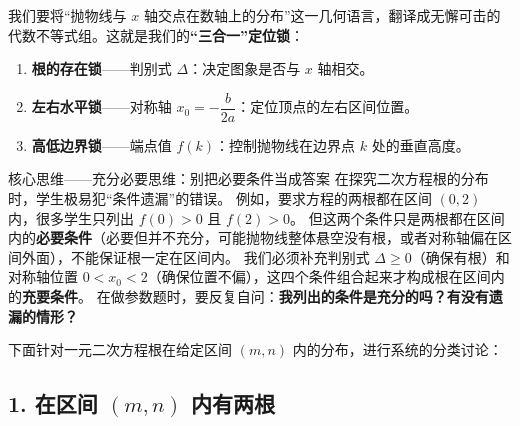 \documentclass[11pt,a4paper]{ctexart}
\begin{document}
我们要将“抛物线与 $x$ 轴交点在数轴上的分布”这一几何语言，翻译成无懈可击的代数不等式组。这就是我们的\textbf{“三合一”定位锁}：
\begin{enumerate}
  \item \textbf{根的存在锁}——判别式 $\Delta$：决定图象是否与 $x$ 轴相交。
  \item \textbf{左右水平锁}——对称轴 $x_0 = -\dfrac{b}{2a}$：定位顶点的左右区间位置。
  \item \textbf{高低边界锁}——端点值 $f(k)$：控制抛物线在边界点 $k$ 处的垂直高度。
\end{enumerate}

\begin{keybox}{核心思维——充分必要思维：别把必要条件当成答案}
在探究二次方程根的分布时，学生极易犯“条件遗漏”的错误。
例如，要求方程的两根都在区间 $(0,2)$ 内，很多学生只列出 $f(0)>0$ 且 $f(2)>0$。
但这两个条件只是两根都在区间内的\textbf{必要条件}（必要但并不充分，可能抛物线整体悬空没有根，或者对称轴偏在区间外面），不能保证根一定在区间内。
我们必须补充判别式 $\Delta \ge 0$（确保有根）和对称轴位置 $0 < x_0 < 2$（确保位置不偏），这四个条件组合起来才构成根在区间内的\textbf{充要条件}。
在做参数题时，要反复自问：\textbf{我列出的条件是充分的吗？有没有遗漏的情形？}
\end{keybox}

下面针对一元二次方程根在给定区间 $(m, n)$ 内的分布，进行系统的分类讨论：

\subsection{1. 在区间 $(m, n)$ 内有两根}
\par{}\addvspace{0.3em}
\end{document}
